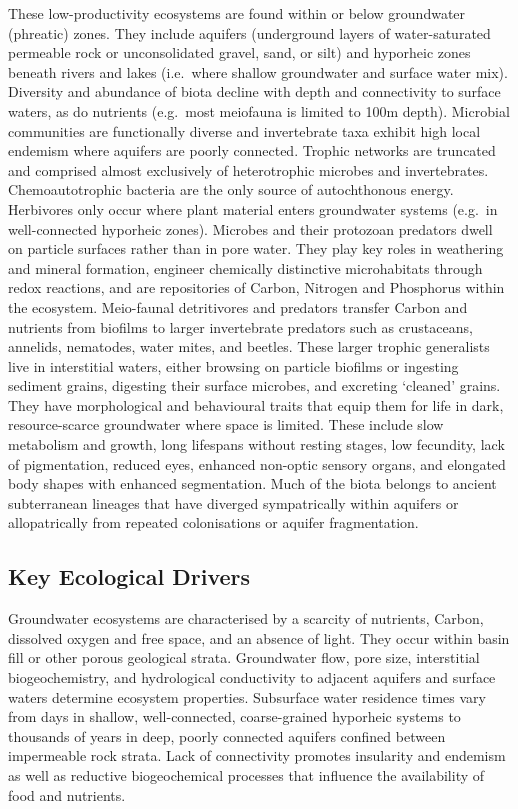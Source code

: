 \documentclass[
  letterpaper,
  DIV=11,
  numbers=noendperiod]{scrartcl}
\begin{document}
These low-productivity ecosystems are found within or below groundwater
(phreatic) zones. They include aquifers (underground layers of
water-saturated permeable rock or unconsolidated gravel, sand, or silt)
and hyporheic zones beneath rivers and lakes (i.e.~where shallow
groundwater and surface water mix). Diversity and abundance of biota
decline with depth and connectivity to surface waters, as do nutrients
(e.g.~most meiofauna is limited to 100m depth). Microbial communities
are functionally diverse and invertebrate taxa exhibit high local
endemism where aquifers are poorly connected. Trophic networks are
truncated and comprised almost exclusively of heterotrophic microbes and
invertebrates. Chemoautotrophic bacteria are the only source of
autochthonous energy. Herbivores only occur where plant material enters
groundwater systems (e.g.~in well-connected hyporheic zones). Microbes
and their protozoan predators dwell on particle surfaces rather than in
pore water. They play key roles in weathering and mineral formation,
engineer chemically distinctive microhabitats through redox reactions,
and are repositories of Carbon, Nitrogen and Phosphorus within the
ecosystem. Meio-faunal detritivores and predators transfer Carbon and
nutrients from biofilms to larger invertebrate predators such as
crustaceans, annelids, nematodes, water mites, and beetles. These larger
trophic generalists live in interstitial waters, either browsing on
particle biofilms or ingesting sediment grains, digesting their surface
microbes, and excreting `cleaned' grains. They have morphological and
behavioural traits that equip them for life in dark, resource-scarce
groundwater where space is limited. These include slow metabolism and
growth, long lifespans without resting stages, low fecundity, lack of
pigmentation, reduced eyes, enhanced non-optic sensory organs, and
elongated body shapes with enhanced segmentation. Much of the biota
belongs to ancient subterranean lineages that have diverged
sympatrically within aquifers or allopatrically from repeated
colonisations or aquifer fragmentation.

\subsection{Key Ecological Drivers}\label{key-ecological-drivers-63}

Groundwater ecosystems are characterised by a scarcity of nutrients,
Carbon, dissolved oxygen and free space, and an absence of light. They
occur within basin fill or other porous geological strata. Groundwater
flow, pore size, interstitial biogeochemistry, and hydrological
conductivity to adjacent aquifers and surface waters determine ecosystem
properties. Subsurface water residence times vary from days in shallow,
well-connected, coarse-grained hyporheic systems to thousands of years
in deep, poorly connected aquifers confined between impermeable rock
strata. Lack of connectivity promotes insularity and endemism as well as
reductive biogeochemical processes that influence the availability of
food and nutrients.
\end{document}

